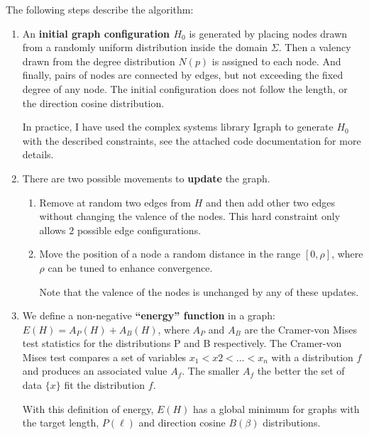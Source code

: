 The following steps describe the algorithm:
\begin{enumerate}[label=\textbf{\Roman*}]
  \item An \textbf{initial graph configuration $H_0$} is generated by placing
  nodes drawn from a randomly uniform distribution inside the domain $\Sigma$. Then a
  valency drawn from the degree distribution $N(p)$ is assigned to each node.
  And finally, pairs of nodes are connected by edges, but not exceeding the
  fixed degree of any node. The initial configuration does not follow
  the length, or the direction cosine distribution.

  In practice, I have used the complex systems library Igraph to generate $H_0$
  with the described constraints, see the attached code documentation for more
  details.
  \item There are two possible movements to \textbf{update} the graph.
    \begin{enumerate}[label=\textbf{\alph*)}]
    \item Remove at random two edges from $H$ and then add other two edges
    without changing the valence of the nodes. This hard constraint only allows
    $2$ possible edge configurations.
    \item Move the position of a node a random distance in the range $[0,\rho]$,
    where $\rho$ can be tuned to enhance convergence.

    Note that the valence of the nodes is unchanged by any of these updates.
  \end{enumerate}

  \item We define a non-negative \textbf{``energy'' function} in a graph:
  $E(H)=A_P(H) + A_B(H)$, where $A_P$ and $A_B$ are the Cramer-von Mises test
  statistics for the distributions P and B respectively. The Cramer-von Mises
  test \citep{anderson_distribution_1962} compares a set of variables $x_1<x2<\ldots<x_n$ with a
  distribution $f$ and produces an associated value $A_f$. The smaller $A_f$ the better the set
  of data $\{x\}$ fit the distribution $f$.

  With this definition of energy, $E(H)$ has a global minimum for graphs with
  the target length, $P(\ell)$ and direction cosine $B(\beta)$ distributions.


\end{enumerate}
